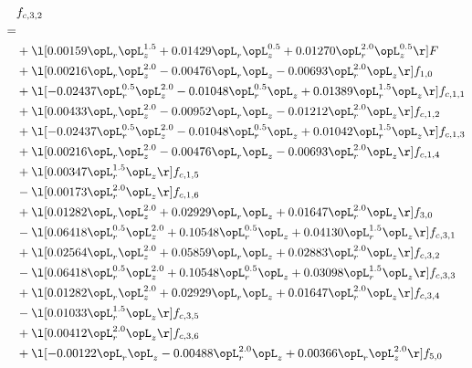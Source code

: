 

\begin{alignat}{2} 
\label{eq:f_32_1} 
& f_{c,3,2} \nonumber \\ 
 = \\ 
& + \l[  0.00159 \opL_r \opL_z^{1.5} +  0.01429 \opL_r \opL_z^{0.5} +  0.01270 \opL_r^{2.0} \opL_z^{0.5}  \r] F \nonumber \\ 
& + \l[  0.00216 \opL_r \opL_z^{2.0}   -0.00476 \opL_r \opL_z   -0.00693 \opL_r^{2.0} \opL_z  \r] f_{1,0} \nonumber \\ 
& + \l[  -0.02437 \opL_r^{0.5} \opL_z^{2.0}   -0.01048 \opL_r^{0.5} \opL_z +  0.01389 \opL_r^{1.5} \opL_z  \r] f_{c,1,1} \nonumber \\ 
& + \l[  0.00433 \opL_r \opL_z^{2.0}   -0.00952 \opL_r \opL_z   -0.01212 \opL_r^{2.0} \opL_z  \r] f_{c,1,2} \nonumber \\ 
& + \l[  -0.02437 \opL_r^{0.5} \opL_z^{2.0}   -0.01048 \opL_r^{0.5} \opL_z +  0.01042 \opL_r^{1.5} \opL_z  \r] f_{c,1,3} \nonumber \\ 
& + \l[  0.00216 \opL_r \opL_z^{2.0}   -0.00476 \opL_r \opL_z   -0.00693 \opL_r^{2.0} \opL_z  \r] f_{c,1,4} \nonumber \\ 
& + \l[  0.00347 \opL_r^{1.5} \opL_z  \r] f_{c,1,5} \nonumber \\ 
& - \l[  0.00173 \opL_r^{2.0} \opL_z  \r] f_{c,1,6} \nonumber \\ 
& + \l[  0.01282 \opL_r \opL_z^{2.0} +  0.02929 \opL_r \opL_z +  0.01647 \opL_r^{2.0} \opL_z  \r] f_{3,0} \nonumber \\ 
& - \l[  0.06418 \opL_r^{0.5} \opL_z^{2.0} +  0.10548 \opL_r^{0.5} \opL_z +  0.04130 \opL_r^{1.5} \opL_z  \r] f_{c,3,1} \nonumber \\ 
& + \l[  0.02564 \opL_r \opL_z^{2.0} +  0.05859 \opL_r \opL_z +  0.02883 \opL_r^{2.0} \opL_z  \r] f_{c,3,2} \nonumber \\ 
& - \l[  0.06418 \opL_r^{0.5} \opL_z^{2.0} +  0.10548 \opL_r^{0.5} \opL_z +  0.03098 \opL_r^{1.5} \opL_z  \r] f_{c,3,3} \nonumber \\ 
& + \l[  0.01282 \opL_r \opL_z^{2.0} +  0.02929 \opL_r \opL_z +  0.01647 \opL_r^{2.0} \opL_z  \r] f_{c,3,4} \nonumber \\ 
& - \l[  0.01033 \opL_r^{1.5} \opL_z  \r] f_{c,3,5} \nonumber \\ 
& + \l[  0.00412 \opL_r^{2.0} \opL_z  \r] f_{c,3,6} \nonumber \\ 
& + \l[  -0.00122 \opL_r \opL_z   -0.00488 \opL_r^{2.0} \opL_z +  0.00366 \opL_r \opL_z^{2.0}  \r] f_{5,0} \nonumber \\ 

\end{alignat}
